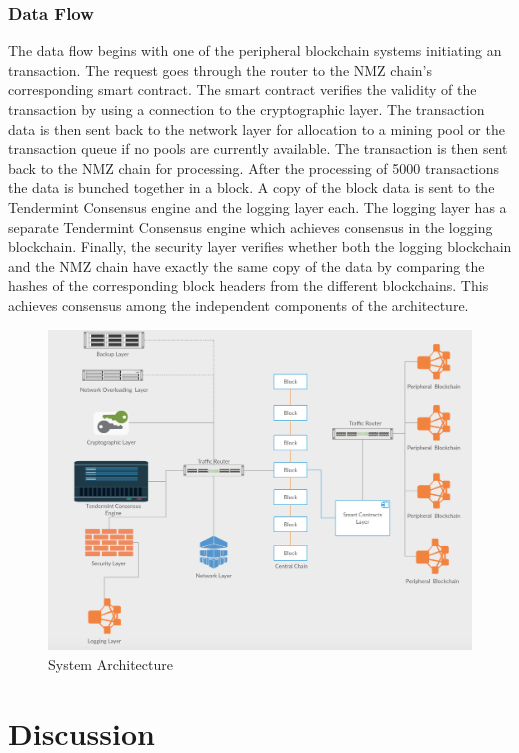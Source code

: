 \documentclass[a4paper,twoside,phd]{BYUPhys}
\begin{document}
\subsection{Data Flow}
The data flow begins with one of the peripheral blockchain systems initiating an transaction. The request goes through the router to the NMZ chain's corresponding smart contract. The smart contract verifies the validity of the transaction by using a connection to the cryptographic layer. The transaction data is then sent back to the network layer for allocation to a mining pool or the transaction queue if no pools are currently available. The transaction is then sent back to the NMZ chain for processing. After the processing of 5000 transactions the data is bunched together in a block. A copy of the block data is sent to the Tendermint Consensus engine and the logging layer each. The logging layer has a separate Tendermint Consensus engine which achieves consensus in the logging blockchain. Finally, the security layer verifies whether both the logging blockchain and the NMZ chain have exactly the same copy of the data by comparing the hashes of the corresponding block headers from the different blockchains. This achieves consensus among the independent components of the architecture.
\begin{figure}
  \includegraphics[width=\linewidth]{system_overview.png}
  \caption{System Architecture}
  \label{fig:3}
\end{figure}
\chapter{Discussion}
\end{document}
